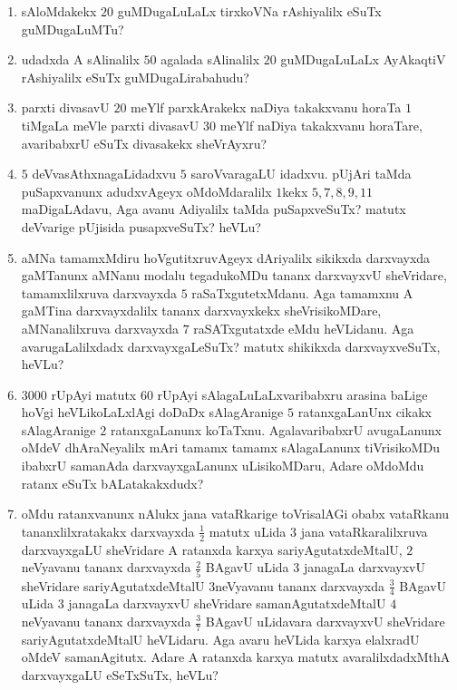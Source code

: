 \begin{enumerate}
\item sAloMdakekx $20$ guMDugaLuLaLx tirxkoVNa rAshiyalilx eSuTx
guMDugaLuMTu?

\item udadxda A sAlinalilx $50$ agalada sAlinalilx $20$ guMDugaLuLaLx
AyAkaqtiV rAshiyalilx eSuTx guMDugaLirabahudu?

\item parxti divasavU $20$ meYlf parxkArakekx naDiya takakxvanu horaTa
$1$ tiMgaLa meVle parxti divasavU $30$ meYlf naDiya takakxvanu
horaTare, avaribabxrU eSuTx divasakekx sheVrAyxru?

\item $5$ deVvasAthxnagaLidadxvu $5$ saroVvaragaLU idadxvu. pUjAri
taMda puSapxvanunx adudxvAgeyx oMdoMdaralilx $1$kekx $5, 7, 8, 9, 11$
maDigaLAdavu, Aga avanu Adiyalilx taMda puSapxveSuTx? matutx deVvarige
pUjisida pusapxveSuTx? heVLu?

\item aMNa tamamxMdiru hoVgutitxruvAgeyx dAriyalilx sikikxda
darxvayxda gaMTanunx aMNanu modalu tegadukoMDu tananx darxvayxvU
sheVridare, tamamxlilxruva darxvayxda $5$ raSaTxgutetxMdanu. Aga
tamamxnu A gaMTina darxvayxdalilx tananx darxvayxkekx sheVrisikoMDare,
aMNanalilxruva darxvayxda $7$ raSATxgutatxde eMdu heVLidanu. Aga
avarugaLalilxdadx darxvayxgaLeSuTx? matutx shikikxda darxvayxveSuTx,
heVLu?

\item $3000$ rUpAyi matutx $60$ rUpAyi sAlagaLuLaLxvaribabxru arasina
baLige hoVgi heVLikoLaLxlAgi doDaDx sAlagAranige $5$ ratanxgaLanUnx
cikakx sAlagAranige $2$ ratanxgaLanunx koTaTxnu. AgalavaribabxrU
avugaLanunx oMdeV dhAraNeyalilx mAri tamamx tamamx sAlagaLanunx
tiVrisikoMDu ibabxrU samanAda darxvayxgaLanunx uLisikoMDaru, Adare
oMdoMdu ratanx eSuTx bALatakakxdudx?

\item oMdu ratanxvanunx nAlukx jana vataRkarige toVrisalAGi obabx
vataRkanu tananxlilxratakakx darxvayxda $\frac{1}{2}$ matutx \hbox{uLida} $3$
jana vataRkaralilxruva darxvayxgaLU sheVridare A ratanxda karxya
sariyAgutatxdeMtalU, $2$neVyavanu tananx darxvayxda $\frac{2}{5}$
BAgavU uLida $3$ janagaLa darxvayxvU sheVridare sariyAgutatxdeMtalU
$3$neVyavanu tananx darxvayxda $\frac{3}{4}$ BAgavU uLida $3$ janagaLa
darxvayxvU sheVridare samanAgutatxdeMtalU $4$ neVyavanu tananx
darxvayxda $\frac{3}{7}$ BAgavU uLidavara darxvayxvU sheVridare
sariyAgutatxdeMtalU heVLidaru. Aga avaru heVLida karxya elalxradU
oMdeV samanAgitutx. Adare A ratanxda karxya matutx avaralilxdadxMthA
darxvayxgaLU eSeTxSuTx, heVLu?


\end{enumerate}
